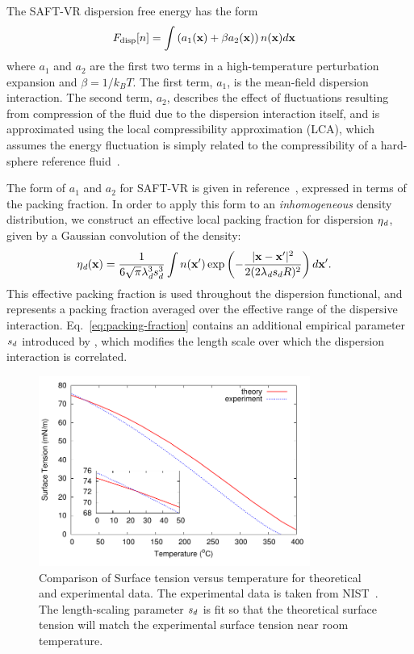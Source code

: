 The SAFT-VR dispersion free energy has the form~\cite{gil-villegas-1997-SAFT-VR}
\begin{align}
  F_\text{disp}[n] &= \int \left(a_1(\textbf{x}) + \beta a_2(\textbf{x})\right)n(\textbf{x})d\textbf{x}
  \label{eq:dispersion-term}
\end{align}
where $a_1$ and $a_2$ are the first two terms in a high-temperature
perturbation expansion and $\beta=1/k_BT$.  The first term, $a_1$, is
the mean-field dispersion interaction. The second term, $a_2$, describes the
effect of fluctuations resulting from compression of the fluid due
to the dispersion interaction itself, and is approximated
using the local compressibility approximation (LCA), which
assumes the energy fluctuation is simply related to the
compressibility of a hard-sphere reference fluid~\cite{barker1976liquid}.

The form of $a_1$ and $a_2$ for SAFT-VR is given in
reference~\cite{gil-villegas-1997-SAFT-VR}, expressed in terms
of the packing fraction.  In order to apply this form to an
\emph{inhomogeneous} density distribution, we construct an effective local
packing fraction for dispersion $\eta_\textit{d}$, given by a Gaussian
convolution of the density:
\begin{align}
  \eta_\textit{d}(\textbf{x}) &= \frac{1}{6\sqrt{\pi} \lambda_\textit{d}^3s_d^3}
  \int n(\textbf{x}')\exp\left({-\frac{|\textbf{x}-\textbf{x}'|^2}{2(2 \lambda_\textit{d}
      s_d R)^2}}\right)d\textbf{x}'.\label{eq:packing-fraction}
\end{align}
This effective packing fraction is used throughout the dispersion
functional, and represents a packing fraction averaged over the
effective range of the dispersive interaction.
Eq.~\ref{eq:packing-fraction} contains an additional empirical
parameter $s_d$ introduced by \hughesetal, which modifies the
length scale over which the dispersion interaction is correlated.

\begin{figure}
\begin{center}
\includegraphics[width=3.5in]{figs/surface-tension}
\end{center}
\caption{Comparison of Surface tension versus temperature for
  theoretical and experimental data. The experimental data is taken
  from NIST~\cite{nistwater}.  The length-scaling parameter $s_d$
  is fit so that the theoretical surface tension will match the
  experimental surface tension near room temperature.}
\label{fig:surface-tension}
\end{figure}

